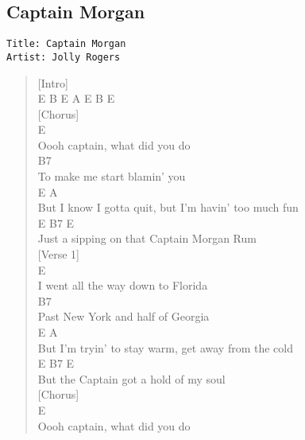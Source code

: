 \documentclass[11pt]{article}
\begin{document}
\subsection{Captain Morgan}
\label{sec:org64e1c6d}
\begin{verbatim}
Title: Captain Morgan
Artist: Jolly Rogers
\end{verbatim}
\begin{verse}
[Intro]\\
E B E A E B E\\
\vspace*{1em}
\vspace*{1em}
[Chorus]\\
E\\
Oooh captain, what did you do\\
\hspace*{26em}B7\\
To make me start blamin' you\\
\hspace*{4em}E                            A\\
But I know I gotta quit, but I'm havin' too much fun\\
\hspace*{9em}E              B7            E\\
Just a sipping on that Captain Morgan Rum\\
\vspace*{1em}
\vspace*{1em}
\vspace*{1em}
[Verse 1]\\
E\\
I went all the way down to Florida\\
\hspace*{30em}B7\\
Past New York and half of Georgia\\
\hspace*{3em}E                              A\\
But I'm tryin' to stay warm, get away from the cold\\
\hspace*{8em}E              B7        E\\
But the Captain got a hold of my soul\\
\vspace*{1em}
\vspace*{1em}
\vspace*{1em}
[Chorus]\\
E\\
Oooh captain, what did you do\\

\end{verse}
\end{document}
